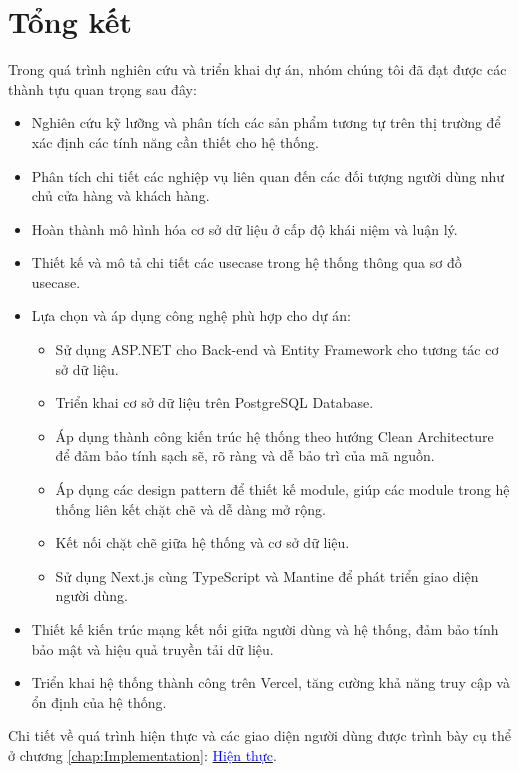 \section{Tổng kết}
Trong quá trình nghiên cứu và triển khai dự án, nhóm chúng tôi đã đạt được các thành tựu quan trọng sau đây:
\begin{itemize}
    \item Nghiên cứu kỹ lưỡng và phân tích các sản phẩm tương tự trên thị trường để xác định các tính năng cần thiết cho hệ thống.
    \item Phân tích chi tiết các nghiệp vụ liên quan đến các đối tượng người dùng như chủ cửa hàng và khách hàng.
    \item Hoàn thành mô hình hóa cơ sở dữ liệu ở cấp độ khái niệm và luận lý.
    \item Thiết kế và mô tả chi tiết các usecase trong hệ thống thông qua sơ đồ usecase.
    \item Lựa chọn và áp dụng công nghệ phù hợp cho dự án:
        \begin{itemize}
            \item Sử dụng ASP.NET cho Back-end và Entity Framework cho tương tác cơ sở dữ liệu.
            \item Triển khai cơ sở dữ liệu trên PostgreSQL Database.
            \item Áp dụng thành công kiến trúc hệ thống theo hướng Clean Architecture để đảm bảo tính sạch sẽ, rõ ràng và dễ bảo trì của mã nguồn.
            \item Áp dụng các design pattern để thiết kế module, giúp các module trong hệ thống liên kết chặt chẽ và dễ dàng mở rộng.
            \item Kết nối chặt chẽ giữa hệ thống và cơ sở dữ liệu.
            \item Sử dụng Next.js cùng TypeScript và Mantine để phát triển giao diện người dùng.
        \end{itemize}
    \item Thiết kế kiến trúc mạng kết nối giữa người dùng và hệ thống, đảm bảo tính bảo mật và hiệu quả truyền tải dữ liệu.
    \item Triển khai hệ thống thành công trên Vercel, tăng cường khả năng truy cập và ổn định của hệ thống.
\end{itemize}

Chi tiết về quá trình hiện thực và các giao diện người dùng được trình bày cụ thể ở chương \ref{chap:Implementation}:
\hyperref[chap:Implementation]{\textcolor{blue}{Hiện thực}}.
